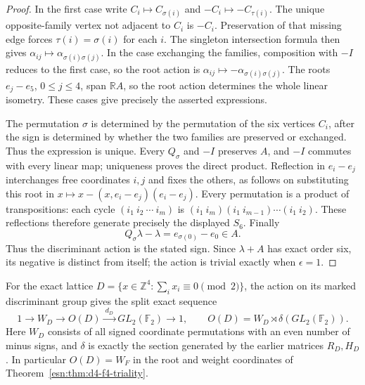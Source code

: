 \begin{proof}
In the first case write
\(C_i\mapsto C_{\sigma(i)}\) and
\(-C_i\mapsto-C_{\tau(i)}\).
The unique opposite-family vertex not adjacent to \(C_i\) is \(-C_i\).
Preservation of that missing edge forces \(\tau(i)=\sigma(i)\)
for each \(i\).  The singleton intersection formula then gives
\(\alpha_{ij}\mapsto\alpha_{\sigma(i)\sigma(j)}\).
In the case exchanging the families, composition with \(-I\) reduces
to the first case, so the root action is
\(\alpha_{ij}\mapsto-\alpha_{\sigma(i)\sigma(j)}\).
The roots \(e_j-e_5\), \(0\le j\le4\), span \(\mathbb R A\),
so the root action determines the whole linear isometry.  These cases
give precisely the asserted expressions.

The permutation \(\sigma\) is determined by the permutation of the
six vertices \(C_i\), after the sign is determined by whether the two
families are preserved or exchanged.  Thus the expression is unique.
Every \(Q_\sigma\) and \(-I\) preserves \(A\), and \(-I\)
commutes with every linear map; uniqueness proves the direct product.
Reflection in \(e_i-e_j\) interchanges free coordinates \(i,j\)
and fixes the others, as follows on substituting this root in
\(x\mapsto x-(x,e_i-e_j)(e_i-e_j)\).
Every permutation is a product of transpositions: each cycle
\((i_1\ i_2\ \cdots\ i_m)\) is
\((i_1\ i_m)(i_1\ i_{m-1})\cdots(i_1\ i_2)\).
These reflections therefore generate precisely the displayed \(S_6\).
Finally
\[
 Q_\sigma\lambda-\lambda=e_{\sigma(0)}-e_0\in A.
\]
Thus the discriminant action is the stated sign.  Since \(\lambda+A\)
has exact order six, its negative is distinct from itself; the action
is trivial exactly when \(\epsilon=1\).
\end{proof}

\begin{theorem}
\label{esn:fa:thm:d4-automorphisms}
For the exact lattice
\(D=\{x\in\mathbb Z^4:\sum_i x_i\equiv0\pmod2\}\),
the action on its marked discriminant group gives the split exact sequence
\[
 1\longrightarrow W_D\longrightarrow O(D)
   \xrightarrow{\ d_D\ }GL_2(\mathbb F_2)\longrightarrow1,
 \qquad
 O(D)=W_D\rtimes\delta(GL_2(\mathbb F_2)).
\]
Here \(W_D\) consists of all signed coordinate permutations with an even
number of minus signs, and \(\delta\) is exactly the section generated
by the earlier matrices \(R_D,H_D\).  In particular \(O(D)=W_F\)
in the root and weight coordinates of
Theorem~\ref{esn:thm:d4-f4-triality}.
\end{theorem}

